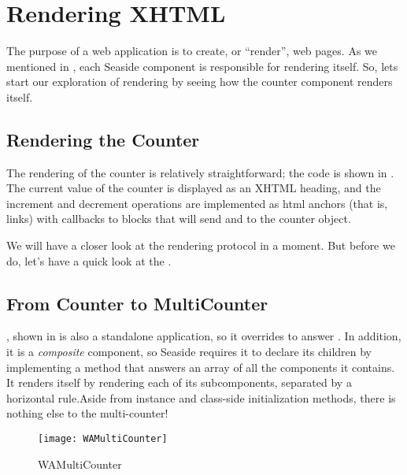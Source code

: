 \documentclass[a4paper,10pt,twoside]{book}
\begin{document}
\section{Rendering XHTML}

The purpose of a web application is to create, or ``render'', web pages. As we mentioned
in , each Seaside component is responsible for rendering itself.
So, lets start our exploration of rendering by seeing how the counter component renders
itself.

\subsection{Rendering the Counter}

The rendering of the counter is relatively straightforward; the code is shown in
.
The current value of the counter is displayed as an XHTML heading, and the increment and
decrement operations are implemented as html anchors (that is, links) with callbacks to
blocks that will send  and  to the counter object.

We will have a closer look at the rendering protocol in a moment.
But before we do, let's have a quick look at the .

\subsection{From Counter to MultiCounter}

, shown in  is also a standalone application,
so it overrides  to answer .
In addition, it is a \emph{composite} component, so Seaside requires it to declare its
children by implementing a method  that answers an array of all the
components it contains.
It renders itself by rendering each of its subcomponents, separated by a horizontal
rule.Aside from instance and class-side initialization methods, there is nothing else to
the
multi-counter!

\begin{figure}[bht]
\begin{center}
\texttt{[image: WAMultiCounter]}
\caption{WAMultiCounter}
\end{center}
\end{figure}

\end{document}
